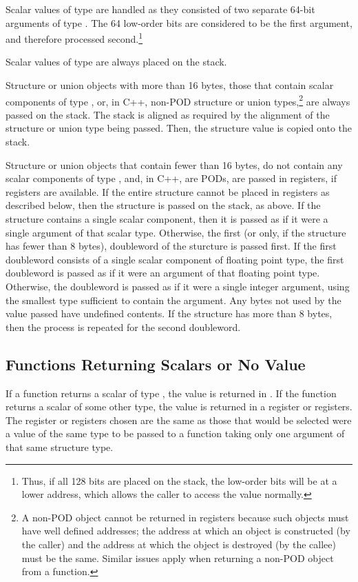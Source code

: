 Scalar values of type  are handled as they consisted
of two separate 64-bit arguments of type .  The 64
low-order bits are considered to be the first argument, and therefore
processed second.\footnote{Thus, if all 128 bits are placed on the
  stack, the low-order bits will be at a lower address, which allows
  the caller to access the value normally.}

Scalar values of type  are always placed on the stack.

Structure or union objects with more than 16 bytes, those that contain
scalar components of type , or, in C++, non-POD structure
or union types,\footnote{A non-POD object cannot be returned in
  registers because such objects must have well defined addresses; the
  address at which an object is constructed (by the caller) and the
  address at which the object is destroyed (by the callee) must be the
  same.  Similar issues apply when returning a non-POD object from a
  function.} are always passed on the stack.  The stack is aligned as
required by the alignment of the structure or union type being passed.
Then, the structure value is copied onto the stack.

Structure or union objects that contain fewer than 16 bytes, do not
contain any scalar components of type , and, in C++, are
PODs, are passed in registers, if registers are available.  If the
entire structure cannot be placed in registers as described below,
then the structure is passed on the stack, as above.  If the structure
contains a single scalar component, then it is passed as if it were a
single argument of that scalar type.  Otherwise, the first (or only,
if the structure has fewer than 8 bytes), doubleword of the sturcture
is passed first.  If the first doubleword consists of a single scalar
component of floating point type, the first doubleword is passed as if
it were an argument of that floating point type.  Otherwise, the
doubleword is passed as if it were a single integer argument, using
the smallest type sufficient to contain the argument.  Any bytes not
used by the value passed have undefined contents.  If the structure
has more than 8 bytes, then the process is repeated for the second
doubleword.

\subsection{Functions Returning Scalars or No Value}

If a function returns a scalar of type , the value is
returned in .  If the function returns a scalar of some other
type, the value is returned in a register or registers.  The register
or registers chosen are the same as those that would be selected were
a value of the same type to be passed to a function taking only one
argument of that same structure type.

